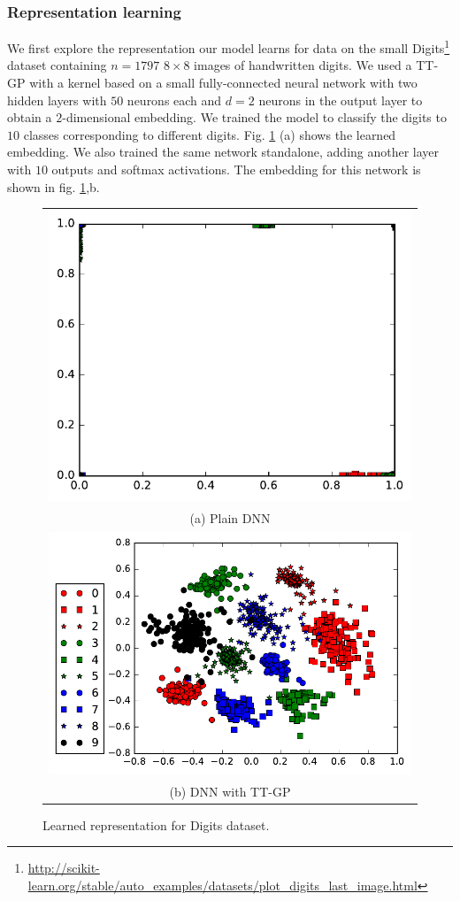   \subsubsection{Representation learning}
  We first explore the representation our model learns for data on the small
  Digits\footnote{\url{http://scikit-learn.org/stable/auto_examples/datasets/plot_digits_last_image.html}}
  dataset containing $n = 1797$ $8 \times 8$ images of handwritten digits. We
  used a TT-GP with a kernel based on a small fully-connected neural network
  with two hidden layers with $50$ neurons each and $d = 2$ neurons in the output
  layer to obtain a $2$-dimensional embedding. We trained the model to classify
  the digits to $10$ classes corresponding to different digits.
  Fig. \ref{digits_embedding} (a) shows the learned embedding. We also trained the same
  network standalone, adding another layer with $10$ outputs and softmax
  activations. The embedding for this network is shown in fig. \ref{digits_embedding},b.
\begin{figure}[!t]
  \begin{center}
      \begin{tabular}{c}
          \includegraphics[height=0.45\linewidth]{pics/embedding_dnn.pdf}\\
           (a) Plain DNN\\
          \hspace{-.9cm}\includegraphics[height=0.45\linewidth]{pics/embedding_ttgp.pdf} \\
          (b) DNN with TT-GP \\
      \end{tabular}
  \end{center}
  \vspace{-0.4cm}
  \caption{Learned representation for Digits dataset.}
  \vspace{-0.4cm}
  \label{digits_embedding}
\end{figure}

